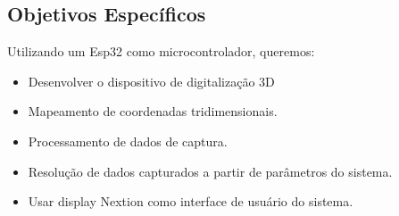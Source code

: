 \subsection{Objetivos Específicos}

Utilizando um Esp32 como microcontrolador, queremos:

\begin{itemize}
    \item Desenvolver o dispositivo de digitalização 3D
    \item Mapeamento de coordenadas tridimensionais.
    \item Processamento de dados de captura.
    \item Resolução de dados capturados a partir de parâmetros do sistema. 
    \item Usar display Nextion como interface de usuário do sistema.
\end{itemize}
